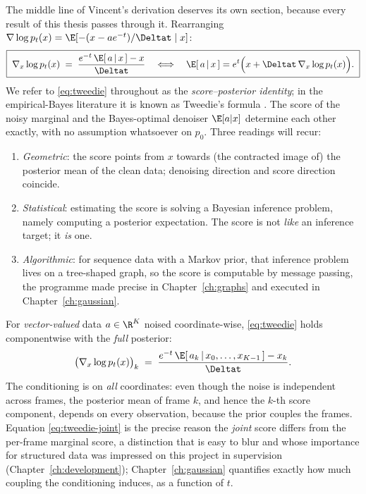 The middle line of Vincent's derivation deserves its own section,
because every result of this thesis passes through it. Rearranging
$\nabla \log p_t(x) = \E[-(x - a e^{-t})/\Deltat \mid x]$:
\begin{equation}
  \boxed{\;
  \nabla_x \log p_t(x)
  \;=\; \frac{e^{-t}\,\E[\,a \,|\, x\,] - x}{\Deltat}
  \quad\Longleftrightarrow\quad
  \E[\,a \,|\, x\,]
  = e^{t} \Big( x + \Deltat\, \nabla_x \log p_t(x) \Big).
  \;}
  \label{eq:tweedie}
\end{equation}
We refer to \eqref{eq:tweedie} throughout as the \emph{score--posterior
identity}; in the empirical-Bayes literature it is known as Tweedie's
formula \citep{robbins1956empirical, miyasawa1961empirical,
efron2011tweedie}. The score of the noisy marginal and the Bayes-optimal
denoiser $\E[a|x]$ determine each other exactly, with no assumption
whatsoever on $p_0$. Three readings will recur:
\begin{enumerate}
  \item \emph{Geometric}: the score points from $x$ towards (the
  contracted image of) the posterior mean of the clean data; denoising
  direction and score direction coincide.
  \item \emph{Statistical}: estimating the score is solving a Bayesian
  inference problem, namely computing a posterior expectation. The score
  is not \emph{like} an inference target; it \emph{is} one.
  \item \emph{Algorithmic}: for sequence data with a Markov prior, that
  inference problem lives on a tree-shaped graph, so the score is
  computable by message passing, the programme made precise in
  Chapter~\ref{ch:graphs} and executed in Chapter~\ref{ch:gaussian}.
\end{enumerate}

For \emph{vector-valued} data $a \in \R^K$ noised coordinate-wise,
\eqref{eq:tweedie} holds componentwise with the \emph{full} posterior:
\begin{equation}
  \big( \nabla_x \log p_t(x) \big)_k
  \;=\; \frac{e^{-t}\, \E[\,a_k \,|\, x_0, \dots, x_{K-1}\,] - x_k}{\Deltat}.
  \label{eq:tweedie-joint}
\end{equation}
The conditioning is on \emph{all} coordinates: even though the noise is
independent across frames, the posterior mean of frame $k$, and hence the
$k$-th score component, depends on every observation, because the prior
couples the frames. Equation \eqref{eq:tweedie-joint} is the precise
reason the \emph{joint} score differs from the per-frame marginal score,
a distinction that is easy to blur and whose importance for structured
data was impressed on this project in supervision
(Chapter~\ref{ch:development}); Chapter~\ref{ch:gaussian} quantifies
exactly how much coupling the conditioning induces, as a function of $t$.

